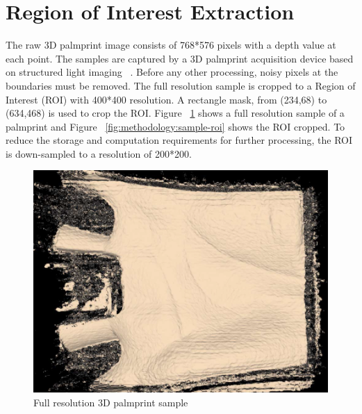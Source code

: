 \section{Region of Interest Extraction}
\label{sec:methodology:roiextraction}

The raw 3D palmprint image consists of 768*576 pixels with a depth value at each point. The samples are captured by a 3D palmprint acquisition device based on structured light imaging ~\cite{Zhang:2009dp}. Before any other processing, noisy pixels at the boundaries must be removed. The full resolution sample is cropped to a Region of Interest (ROI) with 400*400 resolution. A rectangle mask, from (234,68) to (634,468) is used to crop the ROI. Figure ~\ref{fig:methodology:sample-fullres} shows a full resolution sample of a palmprint and Figure ~\ref{fig:methodology:sample-roi} shows the ROI cropped. To reduce the storage and computation requirements for further processing, the ROI is down-sampled to a resolution of 200*200.

\begin{figure}[htb]
\begin{center}
\includegraphics[width=0.9\linewidth]{ch-methodology/figures/sample-fullres}
\caption[Full resolution 3D palmprint sample]{Full resolution 3D palmprint sample}    \label{fig:methodology:sample-fullres}
\end{center}
\end{figure}

